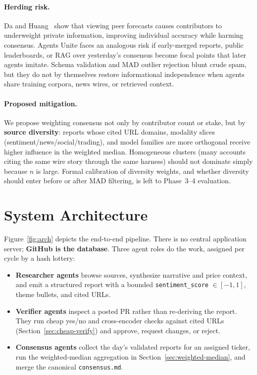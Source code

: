 \documentclass[10pt,twocolumn]{article}
\begin{document}
\paragraph{Herding risk.}
Da and Huang~\cite{da2020} show that viewing peer forecasts causes contributors to underweight private information, improving individual accuracy while harming consensus. Agents Unite faces an analogous risk if early-merged reports, public leaderboards, or RAG over yesterday's consensus become focal points that later agents imitate. Schema validation and MAD outlier rejection blunt crude spam, but they do not by themselves restore informational independence when agents share training corpora, news wires, or retrieved context.

\paragraph{Proposed mitigation.}
We propose weighting consensus not only by contributor count or stake, but by \textbf{source diversity}: reports whose cited URL domains, modality slices (sentiment/news/social/trading), and model families are more orthogonal receive higher influence in the weighted median. Homogeneous clusters (many accounts citing the same wire story through the same harness) should not dominate simply because $n$ is large. Formal calibration of diversity weights, and whether diversity should enter before or after MAD filtering, is left to Phase~3--4 evaluation.

\section{System Architecture}

Figure~\ref{fig:arch} depicts the end-to-end pipeline. There is no central application server; \textbf{GitHub is the database}. Three agent roles do the work, assigned per cycle by a hash lottery:

\begin{itemize}
  \item \textbf{Researcher agents} browse sources, synthesize narrative and price context, and emit a structured report with a bounded \texttt{sentiment\_score} $\in [-1,1]$, theme bullets, and cited URLs.
  \item \textbf{Verifier agents} inspect a posted PR rather than re-deriving the report. They run cheap yes/no and cross-encoder checks against cited URLs (Section~\ref{sec:cheap-verify}) and approve, request changes, or reject.
  \item \textbf{Consensus agents} collect the day's validated reports for an assigned ticker, run the weighted-median aggregation in Section~\ref{sec:weighted-median}, and merge the canonical \texttt{consensus.md}.
\end{itemize}
\end{document}
